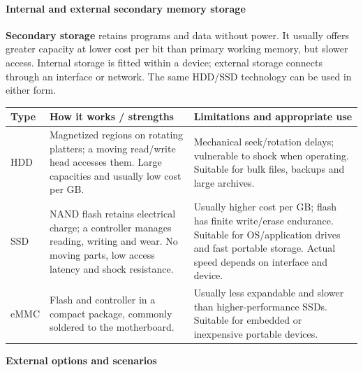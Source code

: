 \documentclass[a4paper,12pt]{article}
\begin{document}
\paragraph{Internal and external secondary memory storage}
\textbf{Secondary storage} retains programs and data without power. It usually offers greater capacity at lower cost per bit than primary working memory, but slower access. Internal storage is fitted within a device; external storage connects through an interface or network. The same HDD/SSD technology can be used in either form.
\begin{center}
\begin{tabularx}{0.98\linewidth}{p{2.5cm} X X}
\toprule
\textbf{Type} & \textbf{How it works / strengths} & \textbf{Limitations and appropriate use} \\
\midrule
HDD & Magnetized regions on rotating platters; a moving read/write head accesses them. Large capacities and usually low cost per GB. & Mechanical seek/rotation delays; vulnerable to shock when operating. Suitable for bulk files, backups and large archives. \\
SSD & NAND flash retains electrical charge; a controller manages reading, writing and wear. No moving parts, low access latency and shock resistance. & Usually higher cost per GB; flash has finite write/erase endurance. Suitable for OS/application drives and fast portable storage. Actual speed depends on interface and device. \\
eMMC & Flash and controller in a compact package, commonly soldered to the motherboard. & Usually less expandable and slower than higher-performance SSDs. Suitable for embedded or inexpensive portable devices. \\
\bottomrule
\end{tabularx}
\end{center}
\textbf{External options and scenarios}
\end{document}
